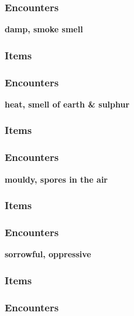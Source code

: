 \subsubsection{Encounters}

\textbf{damp, smoke smell}
\begin{DndReadAloud}
\end{DndReadAloud}
\subsubsection{Items}
\subsubsection{Encounters}

\textbf{heat, smell of earth \& sulphur}
\begin{DndReadAloud}
\end{DndReadAloud}
\subsubsection{Items}
\subsubsection{Encounters}

\textbf{mouldy, spores in the air}
\begin{DndReadAloud}
\end{DndReadAloud}
\subsubsection{Items}
\subsubsection{Encounters}

\textbf{sorrowful, oppressive}
\begin{DndReadAloud}
\end{DndReadAloud}
\subsubsection{Items}
\subsubsection{Encounters}


